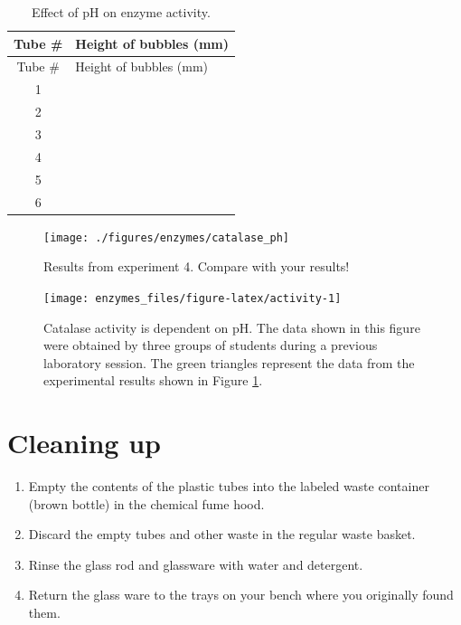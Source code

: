 \documentclass[]{book}
\providecommand{\tightlist}{%
  \setlength{\itemsep}{0pt}\setlength{\parskip}{0pt}}
\theoremstyle{definition}
\theoremstyle{definition}
\theoremstyle{definition}
\theoremstyle{remark}
\begin{document}
\begin{longtable}[]{@{}cl@{}}
\caption{\label{tab:pH} Effect of pH on enzyme activity.}\tabularnewline
\toprule
Tube \# & Height of bubbles (mm)\tabularnewline
\midrule
\endfirsthead
\toprule
Tube \# & Height of bubbles (mm)\tabularnewline
\midrule
\endhead
1 &\tabularnewline
2 &\tabularnewline
3 &\tabularnewline
4 &\tabularnewline
5 &\tabularnewline
6 &\tabularnewline
\bottomrule
\end{longtable}

\begin{figure}

{\centering \texttt{[image: ./figures/enzymes/catalase\_ph]} 

}

\caption{Results from experiment 4. Compare with your results!}\label{fig:pH}
\end{figure}






\begin{figure}

{\centering \texttt{[image: enzymes\_files/figure-latex/activity-1]} 

}

\caption{Catalase activity is dependent on pH. The data shown in this
figure were obtained by three groups of students during a previous
laboratory session. The green triangles represent the data from the
experimental results shown in Figure \ref{fig:pH}.}\label{fig:activity}
\end{figure}

\section{Cleaning up}\label{cleaning-up-5}

\begin{enumerate}
\def\labelenumi{\arabic{enumi}.}
\tightlist
\item
  Empty the contents of the plastic tubes into the labeled waste
  container (brown bottle) in the chemical fume hood.
\item
  Discard the empty tubes and other waste in the regular waste basket.
\item
  Rinse the glass rod and glassware with water and detergent.
\item
  Return the glass ware to the trays on your bench where you originally
  found them.
\end{enumerate}
\end{document}
